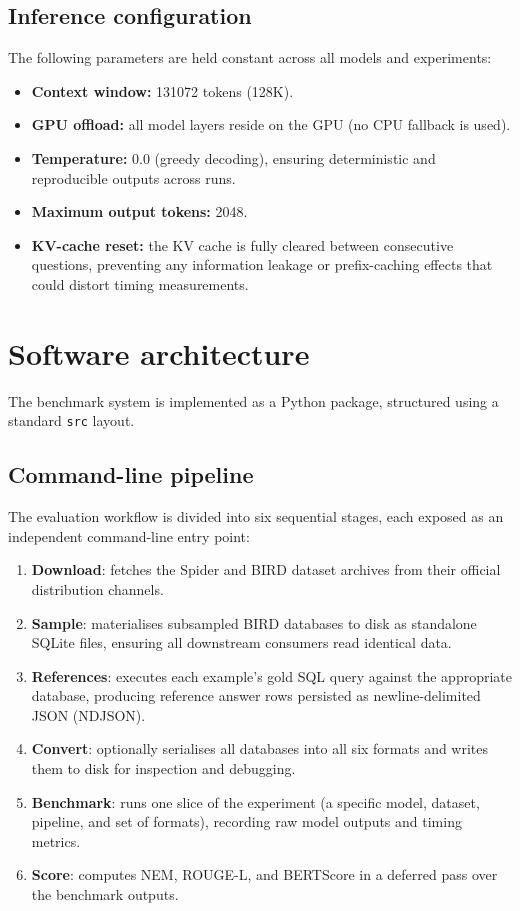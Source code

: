\subsection{Inference configuration}

The following parameters are held constant across all models and experiments:

\begin{itemize}
  \item \textbf{Context window:} \num{131072} tokens (\num{128}K).
  \item \textbf{GPU offload:} all model layers reside on the GPU (no CPU fallback is used).
  \item \textbf{Temperature:} \num{0.0} (greedy decoding), ensuring deterministic and reproducible outputs across runs.
  \item \textbf{Maximum output tokens:} \num{2048}.
  \item \textbf{KV-cache reset:} the KV cache is fully cleared between consecutive questions, preventing any
    information leakage or prefix-caching effects that could distort timing measurements.
\end{itemize}

\section{Software architecture}

The benchmark system is implemented as a Python package, structured using a standard \texttt{src} layout.

\subsection{Command-line pipeline}

The evaluation workflow is divided into six sequential stages, each exposed as an independent command-line entry point:

\begin{enumerate}
  \item \textbf{Download}: fetches the Spider and BIRD dataset archives from their official distribution channels.
  \item \textbf{Sample}: materialises subsampled BIRD databases to disk as standalone SQLite files, ensuring
    all downstream consumers read identical data.
  \item \textbf{References}: executes each example's gold SQL query against the appropriate database, producing
    reference answer rows persisted as newline-delimited JSON (NDJSON).
  \item \textbf{Convert}: optionally serialises all databases into all six formats and writes them to disk for
    inspection and debugging.
  \item \textbf{Benchmark}: runs one slice of the experiment (a specific model, dataset, pipeline, and set of
    formats), recording raw model outputs and timing metrics.
  \item \textbf{Score}: computes NEM, ROUGE-L, and BERTScore in a deferred pass over the benchmark outputs.
\end{enumerate}

